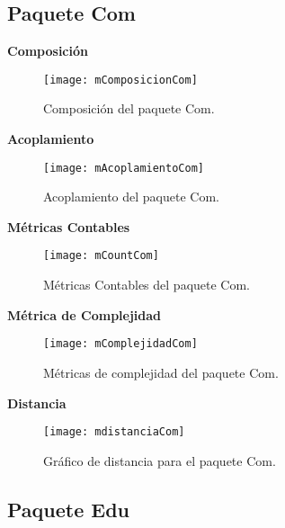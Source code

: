 \newpage
\subsection{Paquete Com}

\textbf{Composición}
\begin{figure}[H]
	\centering
	\texttt{[image: mComposicionCom]}
	\centering
	\caption{Composición del paquete Com.}
	\label{fig:mComposicionCom}
\end{figure}
\textbf{Acoplamiento}
\begin{figure}[H]
	\centering
	\texttt{[image: mAcoplamientoCom]}
	\centering
	\caption{Acoplamiento del paquete Com.}
	\label{fig:mAcoplamientoCom}
\end{figure}
\textbf{Métricas Contables}
\begin{figure}[H]
	\centering
	\texttt{[image: mCountCom]}
	\centering
	\caption{Métricas Contables del paquete Com.}
	\label{fig:mCountCom}
\end{figure}
\textbf{Métrica de Complejidad}
\begin{figure}[H]
	\centering
	\texttt{[image: mComplejidadCom]}
	\centering
	\caption{Métricas de complejidad del paquete Com.}
	\label{fig:mComplejidadCom}
\end{figure}
\clearpage
\textbf{Distancia}
\begin{figure}[H]
	\centering
	\texttt{[image: mdistanciaCom]}
	\centering
	\caption{Gráfico de distancia para el paquete Com.}
	\label{fig:mdistanciaCom}
\end{figure}

\newpage
\subsection{Paquete Edu}

